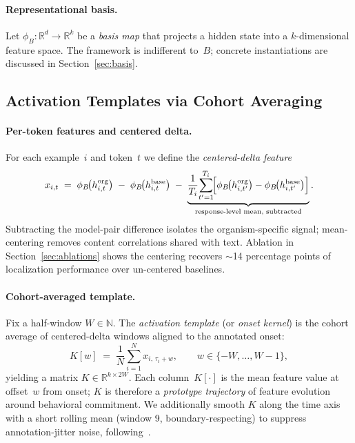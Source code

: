 \paragraph{Representational basis.}
Let $\phi_B:\mathbb{R}^d\!\to\mathbb{R}^k$ be a \emph{basis map} that projects a
hidden state into a $k$-dimensional feature space. The framework is
indifferent to~$B$; concrete instantiations are discussed in
Section~\ref{sec:basis}.

\subsection{Activation Templates via Cohort Averaging}
\label{sec:templates}

\paragraph{Per-token features and centered delta.}
For each example~$i$ and token~$t$ we define the \emph{centered-delta
feature}
\begin{equation}
  \label{eq:centered-delta}
  x_{i,t}
  \;=\;
  \phi_B\!\bigl(h^{\mathrm{org}}_{i,t}\bigr)
  \;-\;
  \phi_B\!\bigl(h^{\mathrm{base}}_{i,t}\bigr)
  \;-\;
  \underbrace{%
    \frac{1}{T_i}\!\sum_{t'=1}^{T_i}\!
    \Bigl[\phi_B\!\bigl(h^{\mathrm{org}}_{i,t'}\bigr)
          -\phi_B\!\bigl(h^{\mathrm{base}}_{i,t'}\bigr)\Bigr]
  }_{\text{response-level mean, subtracted}}.
\end{equation}
Subtracting the model-pair difference isolates the organism-specific signal;
mean-centering removes content correlations shared with text. Ablation in
Section~\ref{sec:ablations} shows the centering recovers $\sim$14 percentage
points of localization performance over un-centered baselines.

\paragraph{Cohort-averaged template.}
Fix a half-window $W\in\mathbb{N}$. The \emph{activation template} (or
\emph{onset kernel}) is the cohort average of centered-delta windows aligned
to the annotated onset:
\begin{equation}
  \label{eq:template}
  K[w]
  \;=\;
  \frac{1}{N}\sum_{i=1}^{N} x_{i,\,\tau_i + w},
  \qquad w\in\{-W,\ldots,W-1\},
\end{equation}
yielding a matrix $K\in\mathbb{R}^{k\times 2W}$. Each column~$K[\cdot]$ is the
mean feature value at offset~$w$ from onset; $K$ is therefore a
\emph{prototype trajectory} of feature evolution around behavioral
commitment. We additionally smooth $K$ along the time axis with a
short rolling mean (window 9, boundary-respecting) to suppress
annotation-jitter noise, following~\citet{schroeter2021misaligned}.

